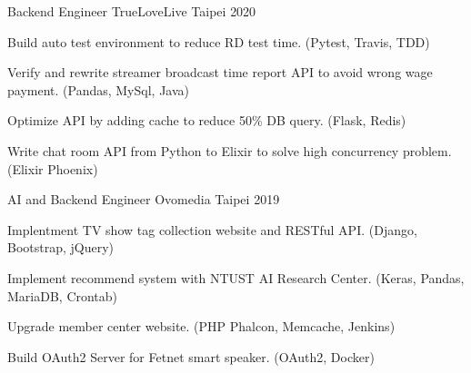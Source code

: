 

\begin{cventries}

  \cventry
    {Backend Engineer} %
    {TrueLoveLive} %
    {Taipei} %
    {2020} %
    {
      \begin{cvitems} %
        \item {Build auto test environment to reduce RD test time. (Pytest, Travis, TDD)}
        \item {Verify and rewrite streamer broadcast time report API to avoid wrong wage payment. (Pandas, MySql, Java)}
        \item {Optimize API by adding cache to reduce 50\% DB query. (Flask, Redis)}
        \item {Write chat room API from Python to Elixir to solve high concurrency problem. (Elixir Phoenix)}
      \end{cvitems}
    }

  \cventry
    {AI and Backend Engineer} %
    {Ovomedia} %
    {Taipei} %
    {2019} %
    {
      \begin{cvitems} %
        \item {Implentment TV show tag collection website and RESTful API. (Django, Bootstrap, jQuery)}
        \item {Implement recommend system with NTUST AI Research Center. (Keras, Pandas, MariaDB, Crontab)}
        \item {Upgrade member center website. (PHP Phalcon, Memcache, Jenkins)}
        \item {Build OAuth2 Server for Fetnet smart speaker. (OAuth2, Docker)}
      \end{cvitems}
    }

\end{cventries}
